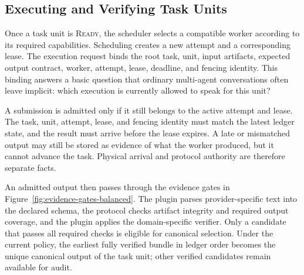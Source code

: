 \documentclass{article}
\theoremstyle{plain}
\begin{document}
\subsection{Executing and Verifying Task Units}
\label{subsec:verified-execution}

Once a task unit is \textsc{Ready}, the scheduler selects a compatible worker according to its required capabilities. Scheduling creates a new attempt and a corresponding lease. The execution request binds the root task, unit, input artifacts, expected output contract, worker, attempt, lease, deadline, and fencing identity. This binding answers a basic question that ordinary multi-agent conversations often leave implicit: which execution is currently allowed to speak for this unit?

A submission is admitted only if it still belongs to the active attempt and lease. The task, unit, attempt, lease, and fencing identity must match the latest ledger state, and the result must arrive before the lease expires. A late or mismatched output may still be stored as evidence of what the worker produced, but it cannot advance the task. Physical arrival and protocol authority are therefore separate facts.

An admitted output then passes through the evidence gates in Figure~\ref{fig:evidence-gates-balanced}. The plugin parses provider-specific text into the declared schema, the protocol checks artifact integrity and required output coverage, and the plugin applies the domain-specific verifier. Only a candidate that passes all required checks is eligible for canonical selection. Under the current policy, the earliest fully verified bundle in ledger order becomes the unique canonical output of the task unit; other verified candidates remain available for audit.
\end{document}
